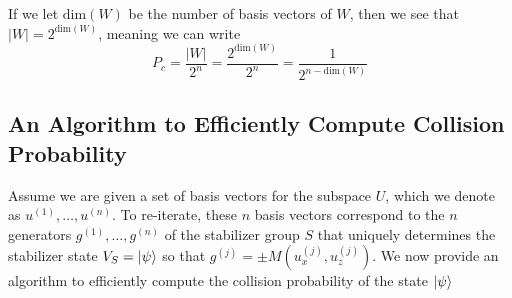 \message{ !name(report_1.tex)}\documentclass[11pt]{article}
\theoremstyle{definition}
\theoremstyle{plain}
\begin{document}
If we let $\text{dim}(W)$ be the number of basis vectors of $W$, then we see that $|W| = 2^{\text{dim}(W)}$, meaning we can write
\begin{equation}\label{simplify_9}
  P_c = \frac{|W|}{2^n} = \frac{2^{\text{dim}(W)}}{2^n} = \frac{1}{2^{n - \text{dim}(W)}}
\end{equation}

\subsection{An Algorithm to Efficiently Compute Collision Probability}
Assume we are given a set of basis vectors for the subspace $U$, which we denote as $u^{(1)}, \ldots, u^{(n)}$. To re-iterate, these $n$ basis vectors correspond to the $n$ generators $g^{(1)}, \ldots, g^{(n)}$ of the stabilizer group $S$ that uniquely determines the stabilizer state $V_S = \ket{\psi}$ so that $g^{(j)} = \pm M(u_x^{(j)}, u_z^{(j)})$. We now provide an algorithm to efficiently compute the collision probability of the state $\ket{\psi}$\\
\end{document}
